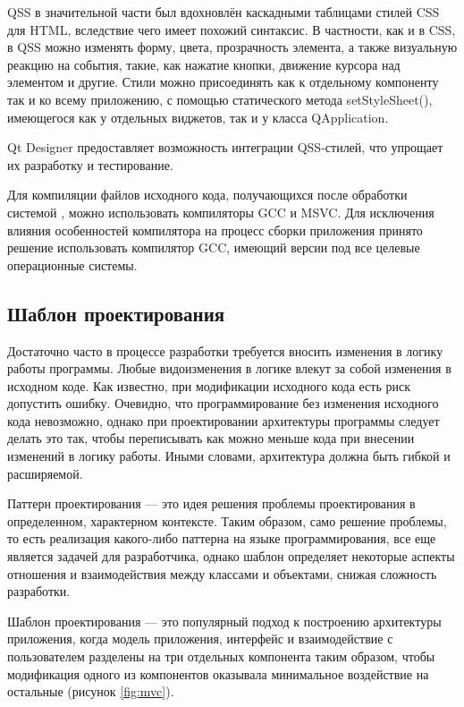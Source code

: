 QSS в значительной части был вдохновлён каскадными таблицами стилей CSS для
HTML, вследствие чего имеет похожий синтаксис. В частности, как и в CSS, в QSS
можно изменять форму, цвета, прозрачность элемента, а также визуальную реакцию
на события, такие, как нажатие кнопки, движение курсора над элементом и другие.
Стили можно присоединять как к отдельному компоненту так и ко всему приложению,
с помощью статического метода setStyleSheet(), имеющегося как у отдельных
виджетов, так и у класса QApplication. 

Qt Designer предоставляет возможность интеграции QSS-стилей, что упрощает их
разработку и тестирование.

Для компиляции файлов исходного кода, получающихся после обработки
системой \moc{}, можно использовать компиляторы GCC и MSVC. Для исключения
влияния особенностей компилятора на процесс сборки приложения принято решение
использовать компилятор GCC, имеющий версии под все целевые операционные
системы.

\subsection{Шаблон проектирования \mvc{}}

Достаточно часто в процессе разработки требуется вносить изменения в логику
работы программы. Любые видоизменения в логике влекут за собой изменения в
исходном коде. Как известно, при модификации исходного кода есть риск допустить
ошибку. Очевидно, что программирование без изменения исходного кода невозможно,
однако при проектировании архитектуры программы следует делать это так, чтобы
переписывать как можно меньше кода при внесении изменений в логику работы. Иными
словами, архитектура должна быть гибкой и расширяемой.

Паттерн проектирования --- это идея решения проблемы проектирования в
определенном, характерном контексте. Таким образом, само решение проблемы, то
есть реализация какого-либо паттерна на языке программирования, все еще является
задачей для разработчика, однако шаблон определяет некоторые аспекты отношения и
взаимодействия между классами и объектами, снижая сложность разработки.

Шаблон проектирования \mvc{} --- это популярный подход к построению архитектуры
приложения, когда модель приложения, интерфейс и взаимодействие с пользователем
разделены на три отдельных компонента таким образом, чтобы модификация одного из
компонентов оказывала минимальное воздействие на остальные (рисунок
\ref{fig:mvc}).

